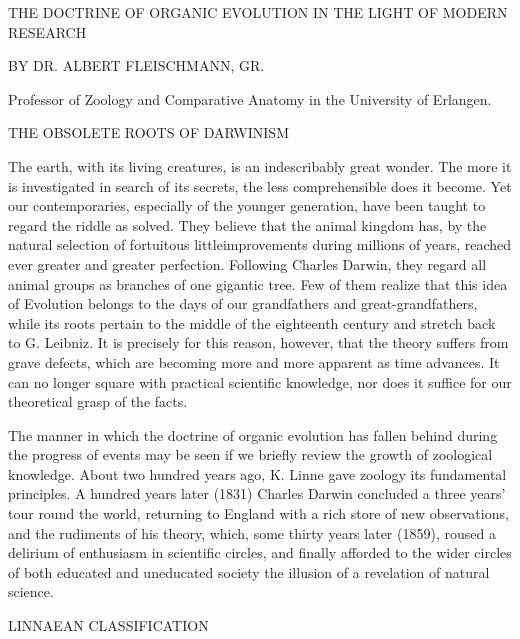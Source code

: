 THE DOCTRINE OF ORGANIC EVOLUTION IN THE LIGHT OF MODERN
RESEARCH

BY DR. ALBERT FLEISCHMANN, GR.

Professor of Zoology and Comparative Anatomy in the University of Erlangen.

THE OBSOLETE ROOTS OF DARWINISM

The earth, with its living creatures, is an indescribably great wonder. The more it is
investigated in search of its secrets, the less comprehensible does it become. Yet our
contemporaries, especially of the younger generation, have been taught to regard the riddle as
solved. They believe that the animal kingdom has, by the natural selection of fortuitous littleimprovements during millions of years, reached ever greater and greater perfection.
Following Charles Darwin, they regard all animal groups as branches of one gigantic tree.
Few of them realize that this idea of Evolution belongs to the days of our grandfathers and
great-grandfathers, while its roots pertain to the middle of the eighteenth century and stretch
back to G. Leibniz. It is precisely for this reason, however, that the theory suffers from grave
defects, which are becoming more and more apparent as time advances. It can no longer
square with practical scientific knowledge, nor does it suffice for our theoretical grasp of the
facts.

The manner in which the doctrine of organic evolution has fallen behind during the progress
of events may be seen if we briefly review the growth of zoological knowledge. About two
hundred years ago, K. Linne gave zoology its fundamental principles. A hundred years later
(1831) Charles Darwin concluded a three years' tour round the world, returning to England
with a rich store of new observations, and the rudiments of his theory, which, some thirty
years later (1859), roused a delirium of enthusiasm in scientific circles, and finally afforded
to the wider circles of both educated and uneducated society the illusion of a revelation of
natural science.

LINNAEAN CLASSIFICATION

